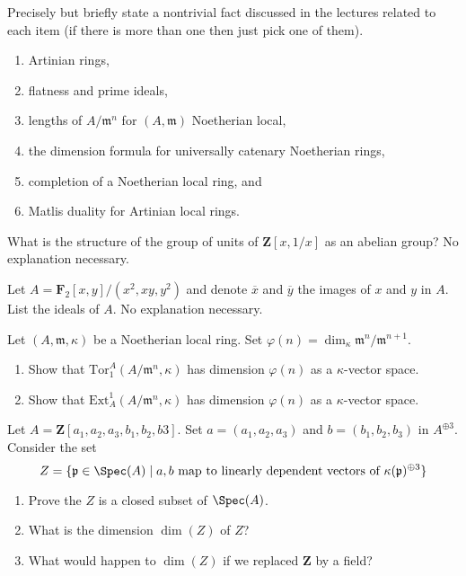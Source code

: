 \begin{exercise}[Theorems]
\label{exercise-results-fall-2021}
Precisely but briefly state a nontrivial fact discussed in the lectures
related to each item (if there is more than one then just pick
one of them).
\begin{enumerate}
\item Artinian rings,
\item flatness and prime ideals,
\item lengths of $A/\mathfrak m^n$ for $(A, \mathfrak m)$ Noetherian local,
\item the dimension formula for universally catenary Noetherian rings,
\item completion of a Noetherian local ring, and
\item Matlis duality for Artinian local rings.
\end{enumerate}
\end{exercise}

\begin{exercise}[Units]
\label{exercise-simple-units}
What is the structure of the group of units of $\mathbf{Z}[x, 1/x]$
as an abelian group? No explanation necessary.
\end{exercise}

\begin{exercise}[Ideals]
\label{exercise-ideals}
Let $A = \mathbf{F}_2[x, y]/(x^2, xy, y^2)$ and denote
$\overline{x}$ and $\overline{y}$ the images of $x$ and $y$ in $A$.
List the ideals of $A$. No explanation necessary.
\end{exercise}

\begin{exercise}
\label{exercise-compute-tor-ext}
Let $(A, \mathfrak m, \kappa)$ be a Noetherian local ring.
Set $\varphi(n) = \dim_\kappa \mathfrak m^n/\mathfrak m^{n + 1}$.
\begin{enumerate}
\item Show that $\text{Tor}_1^A(A/\mathfrak m^n, \kappa)$
has dimension $\varphi(n)$ as a $\kappa$-vector space.
\item Show that $\text{Ext}^1_A(A/\mathfrak m^n, \kappa)$
has dimension $\varphi(n)$ as a $\kappa$-vector space.
\end{enumerate}
\end{exercise}

\begin{exercise}
\label{exercise-two-vectors}
Let $A = \mathbf{Z}[a_1, a_2, a_3, b_1, b_2, b3]$. Set
$a = (a_1, a_2, a_3)$ and $b = (b_1, b_2, b_3)$ in $A^{\oplus 3}$.
Consider the set
$$
Z = \{\mathfrak p \in \Spec(A) \mid a, b
\text{ map to linearly dependent vectors of }
\kappa(\mathfrak p)^{\oplus 3}\}
$$
\begin{enumerate}
\item Prove the $Z$ is a closed subset of $\Spec(A)$.
\item What is the dimension $\dim(Z)$ of $Z$?
\item What would happen to $\dim(Z)$ if we replaced $\mathbf{Z}$ by a field?
\end{enumerate}
\end{exercise}

